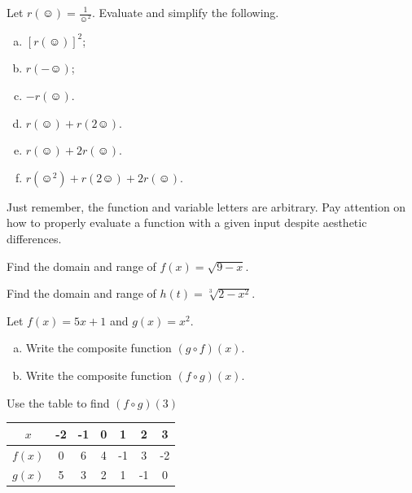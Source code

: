     \begin{problem}
    Let $r(\smiley)=\frac{1}{\smiley^2}$. Evaluate and simplify the following.
    \begin{enumerate}[(a)]
        \item $\left[r(\smiley)\right]^2$;
        \item $r(-\smiley)$;
        \item $-r(\smiley)$.
        \item $r(\smiley)+r(2\smiley)$.
        \item $r(\smiley)+2r(\smiley)$.
        \item $r(\smiley^2)+r(2\smiley)+2r(\smiley)$.
    \end{enumerate}
    \end{problem}

    \begin{remark}
    Just remember, the function and variable letters are arbitrary. Pay attention on how to properly evaluate a function with a given input despite aesthetic differences.
    \end{remark}

    \begin{problem}
    Find the domain and range of $f(x)=\sqrt{9-x}$.
    \end{problem}

    \begin{problem}
    Find the domain and range of $h(t)=\sqrt[3]{2-x^2}$.
    \end{problem}

    \begin{problem}
    Let $f(x)=5x+1$ and $g(x)=x^2$.
    \begin{enumerate}[(a)]
        \item Write the composite function $(g\circ f)(x)$.
        \item Write the composite function $(f\circ g)(x)$.
    \end{enumerate}
    \end{problem}

    \begin{problem}
    Use the table to find $(f\circ g)(3)$
    \begin{center}
    \begin{tabular}{|c||c|c|c|c|c|c|}
        \hline
        $x$ & -2 & -1 & 0 & 1 & 2 & 3 \\
        \hline
        $f(x)$ & 0 & 6 & 4 & -1 & 3 & -2\\
        \hline
        $g(x)$ & 5 & 3 & 2 & 1 & -1 & 0\\
        \hline
    \end{tabular}
    \end{center}
    \end{problem}

